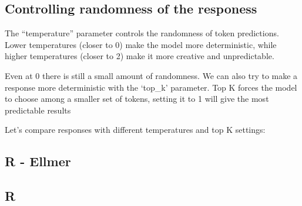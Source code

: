 \documentclass[
  letterpaper,
  DIV=11,
  numbers=noendperiod]{scrreprt}
\newenvironment{Shaded}{\begin{snugshade}}{\end{snugshade}}
\newcommand{\AttributeTok}[1]{\textcolor[rgb]{0.40,0.45,0.13}{#1}}
\newcommand{\CommentTok}[1]{\textcolor[rgb]{0.37,0.37,0.37}{#1}}
\newcommand{\DecValTok}[1]{\textcolor[rgb]{0.68,0.00,0.00}{#1}}
\newcommand{\FunctionTok}[1]{\textcolor[rgb]{0.28,0.35,0.67}{#1}}
\newcommand{\NormalTok}[1]{\textcolor[rgb]{0.00,0.23,0.31}{#1}}
\newcommand{\OtherTok}[1]{\textcolor[rgb]{0.00,0.23,0.31}{#1}}
\newcommand{\SpecialCharTok}[1]{\textcolor[rgb]{0.37,0.37,0.37}{#1}}
\newcommand{\StringTok}[1]{\textcolor[rgb]{0.13,0.47,0.30}{#1}}
\begin{document}
\subsection{Controlling randomness of the
responess}\label{controlling-randomness-of-the-responess}

The ``temperature'' parameter controls the randomness of token
predictions. Lower temperatures (closer to 0) make the model more
deterministic, while higher temperatures (closer to 2) make it more
creative and unpredictable.

Even at 0 there is still a small amount of randomness. We can also try
to make a response more deterministic with the `top\_k' parameter. Top K
forces the model to choose among a smaller set of tokens, setting it to
1 will give the most predictable results

Let's compare responses with different temperatures and top K settings:

\subsection{R - Ellmer}

\begin{Shaded}
\end{Shaded}

\subsection{R}
\end{document}
